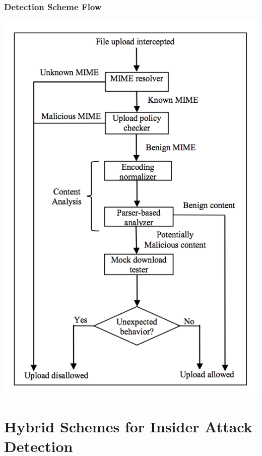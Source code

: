 \documentclass[10pt,mathserif]{beamer}
\begin{document}
\begin{frame}
  \frametitle{Detection Scheme Flow}
  \includegraphics[width=\textwidth,natwidth=545,natheight=802]{figures/content_sniff_flow.png}
\end{frame}

\section{Hybrid Schemes for Insider Attack Detection}
\end{document}
